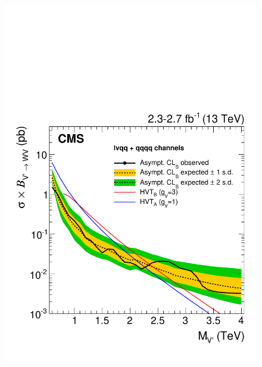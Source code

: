 \begin{figure}[!htb]
     \includegraphics[width=\cmsFigWidth]{B2G-16-004/Figure_006-c.pdf}

\end{figure}
